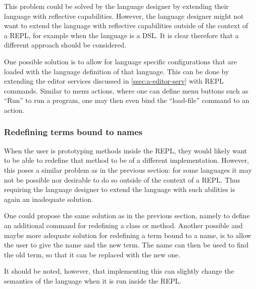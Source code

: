 This problem could be solved by the language designer by extending
their language with reflective capabilities. However, the language
designer might not want to extend the language with reflective
capabilities outside of the context of a REPL, for example when the
language is a DSL. It is clear therefore that a different approach
should be considered.

One possible solution is to allow for language specific configurations
that are loaded with the language definition of that language. This
can be done by extending the editor services discussed in
\cref{ssec:a-editor-serv} with REPL commands. Similar to menu actions,
where one can define menu buttons such as ``Run'' to run a program, one may
then even bind the ``load-file'' command to an action.

\subsubsection{Redefining terms bound to names}
\label{sec:a-redef-cont-bound}
When the user is prototyping methods inside the REPL, they would
likely want to be able to redefine that method to be of a different
implementation. However, this poses a similar problem as in the
previous section: for some languages it may not be possible nor
desirable to do so outside of the context of a REPL. Thus requiring
the language designer to extend the language with such abilities is
again an inadequate solution.

One could propose the same solution as in the previous section, namely to
define an additional command for redefining a class or method. Another possible
and maybe more adequate solution for redefining a term bound to a name, is to
allow the user to give the name and the new term. The name can then be used to
find the old term, so that it can be replaced with the new one.

It should be noted, however, that implementing this can slightly change the
semantics of the language when it is run inside the REPL.

